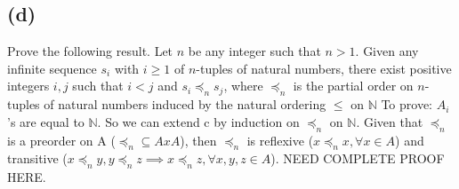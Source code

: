 \documentclass[12pt]{article}
\begin{document}
\subsection*{(d)}
Prove the following result.
\newline
Let $n$ be any  integer such that $n>1$.
Given any infinite sequence $s_i$ with $i \ge 1$ of $n$-tuples of
natural numbers, there exist positive integers $i, j$ such that
$i<j$ and $s_{i}\preceq_{n} s_{j}$, where $\preceq_{n}$ is the
partial order on $n$-tuples of natural numbers
induced by the natural ordering $\le$ on $\mathbb{N}$
To prove: $A_i$'s are equal to $\mathbb{N}$.
So we can extend c by induction on $\preceq_{n}$ on $\mathbb{N}$.
Given that $\preceq_{n}$ is a preorder on A ($\preceq_{n} \subseteq AxA$),
then $\preceq_{n}$ is reflexive ($ x \preceq_{n} x,\forall x \in A$)
and transitive ($x \preceq_{n} y, y \preceq_{n} z \implies x \preceq_{n} z,
\forall x,y,z \in A$). NEED COMPLETE PROOF HERE.
\end{document}
